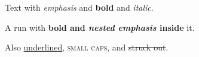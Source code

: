 Text with \emph{emphasis} and \textbf{bold} and \textit{italic}.

A run with \textbf{bold and \emph{nested emphasis} inside} it.

Also \underline{underlined}, \textsc{small caps}, and \sout{struck out}.
